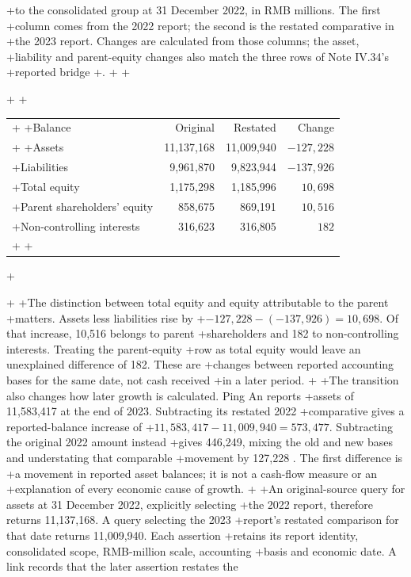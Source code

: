 +to the consolidated group at 31 December 2022, in RMB millions. The first
+column comes from the 2022 report; the second is the restated comparative in
+the 2023 report. Changes are calculated from those columns; the asset,
+liability and parent-equity changes also match the three rows of Note IV.34's
+reported bridge \citep[pp.~146--148]{pingan2022asbe}
+\citep[pp.~141--143 and 192]{pingan2023asbe}.
+
+\begin{center}
+\small
+\begin{tabularx}{\linewidth}{@{}Xrrr@{}}
+\toprule
+Balance & Original & Restated & Change\\
+\midrule
+Assets & 11,137,168 & 11,009,940 & $-127,228$\\
+Liabilities & 9,961,870 & 9,823,944 & $-137,926$\\
+Total equity & 1,175,298 & 1,185,996 & $10,698$\\
+Parent shareholders' equity & 858,675 & 869,191 & $10,516$\\
+Non-controlling interests & 316,623 & 316,805 & $182$\\
+\bottomrule
+\end{tabularx}
+\end{center}
+
+The distinction between total equity and equity attributable to the parent
+matters. Assets less liabilities rise by
+$-127,228-(-137,926)=10,698$. Of that increase, 10,516 belongs to parent
+shareholders and 182 to non-controlling interests. Treating the parent-equity
+row as total equity would leave an unexplained difference of 182. These are
+changes between reported accounting bases for the same date, not cash received
+in a later period.
+
+The transition also changes how later growth is calculated. Ping An reports
+assets of 11,583,417 at the end of 2023. Subtracting its restated 2022
+comparative gives a reported-balance increase of
+$11,583,417-11,009,940=573,477$. Subtracting the original 2022 amount instead
+gives 446,249, mixing the old and new bases and understating that comparable
+movement by 127,228 \citep[p.~141]{pingan2023asbe}. The first difference is
+a movement in reported asset balances; it is not a cash-flow measure or an
+explanation of every economic cause of growth.
+
+An original-source query for assets at 31 December 2022, explicitly selecting
+the 2022 report, therefore returns 11,137,168. A query selecting the 2023
+report's restated comparison for that date returns 11,009,940. Each assertion
+retains its report identity, consolidated scope, RMB-million scale, accounting
+basis and economic date. A link records that the later assertion restates the
